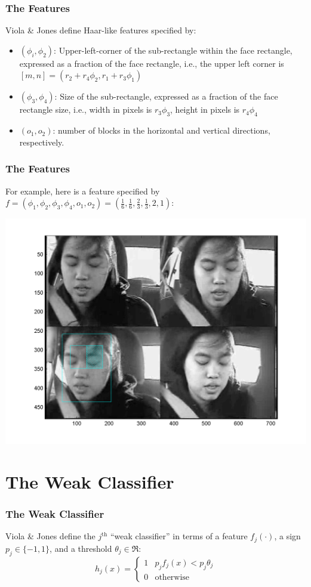 \documentclass{beamer}
\begin{document}
\begin{frame}
  \frametitle{The Features}
  Viola \& Jones define Haar-like features specified by:
  \begin{itemize}
  \item $(\phi_i,\phi_2)$: Upper-left-corner of the sub-rectangle
    within the face rectangle, expressed as a fraction of the
    face rectangle, i.e., the upper left corner is
    $[m,n]=(r_2+r_4\phi_2,r_1+r_3\phi_1)$
  \item $(\phi_3,\phi_4)$: Size of the sub-rectangle, expressed as
    a fraction of the face rectangle size, i.e., width in pixels
    is $r_3\phi_3$, height in pixels is $r_4\phi_4$
  \item $(o_1,o_2)$: number of blocks in the horizontal and
    vertical directions, respectively.
  \end{itemize}
\end{frame}
\begin{frame}
  \frametitle{The Features}
  For example, here is a feature specified by $f=(\phi_1,\phi_2,\phi_3,\phi_4,o_1,o_2)=\left(\frac{1}{6},\frac{1}{6},\frac{2}{3},\frac{1}{3},2,1\right)$:
  \centerline{\includegraphics[height=0.7\textheight]{figs/2rectangle_feature.png}}
\end{frame}


\section[Weak Classifier]{The Weak Classifier}
\setcounter{subsection}{1}

\begin{frame}
  \frametitle{The Weak Classifier}

  Viola \& Jones define the $j^{\text{th}}$ ``weak classifier'' in
  terms of a feature $f_j(\cdot)$, a sign $p_j\in\{-1,1\}$, and a
  threshold $\theta_j\in\Re$:
  \begin{displaymath}
    h_j(x)=\left\{\begin{array}{ll}
    1 & p_jf_j(x) < p_j\theta_j\\
    0 & \mbox{otherwise}
    \end{array}\right.
  \end{displaymath}
\end{frame}
\end{document}
